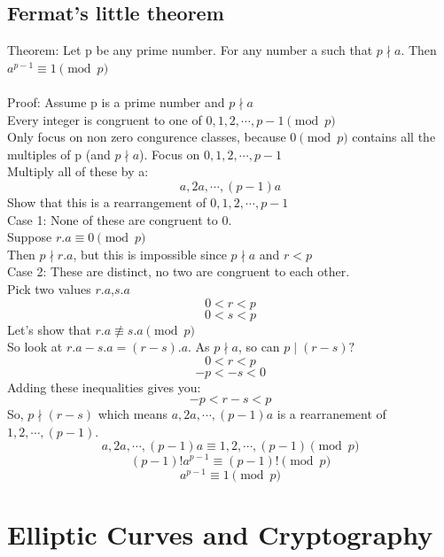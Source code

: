 \documentclass[12pt,a4paper]{report}
\begin{document}
	\section{Fermat’s little theorem}
	Theorem: Let p be any prime number. For any number a such that $p\nmid a$. Then  
$a^{p-1}\equiv 1\pmod p$\\\\
	Proof: Assume p is a prime number and $p \nmid a$ \\
	Every integer is congruent to one of $0,1,2,\cdots,p-1\pmod p$\\
	Only focus on non zero congurence classes, because $0 \pmod p$ contains all the multiples of p (and $p \nmid a$).
	Focus on $0,1,2,\cdots,p-1$\\
	Multiply all of these by a:
	$$a,2a,\cdots,(p-1)a$$
	Show that this is a rearrangement of $0,1,2,\cdots,p-1$\\
	Case 1: None of these are congruent to 0.\\
	Suppose $r.a\equiv 0 \pmod p$\\
	Then $p\nmid r.a$, but this is impossible since $p\nmid a$ and $r<p$\\
	Case 2: These are distinct, no two are congruent to each other.\\
	Pick two values $r.a$,$s.a$\\
	$$0<r<p$$
	$$0<s<p$$
	Let's show that $r.a \not\equiv s.a \pmod p$\\
	So look at $r.a-s.a=(r-s).a$. As $p\nmid a$, so can $p \mid (r-s)?$\\
	$$0<r<p$$
	$$-p<-s<0$$
	Adding these inequalities gives you:
	$$-p<r-s<p$$ 
	So, $p\nmid(r-s)$ which means $a,2a,\cdots,(p-1)a$ is a rearranement of\\ $1,2,\cdots,(p-1).$
		$$a,2a,\cdots,(p-1)a\equiv 1,2,\cdots,(p-1) \pmod p$$
		$$(p-1)!a^{p-1}\equiv (p-1)! \pmod p$$
		$$a^{p-1}\equiv 1 \pmod p$$
		
	
	
	\cleardoublepage	

	\chapter{Elliptic Curves and Cryptography}
\end{document}
